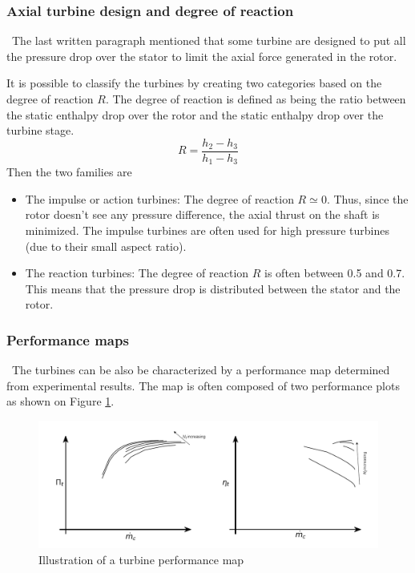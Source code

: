 \subsubsection{Axial turbine design and degree of reaction}
\quad\, The last written paragraph mentioned that some turbine are designed to put all the pressure drop over the stator to limit the axial force generated in the rotor.

It is possible to classify the turbines by creating two categories based on the degree of reaction $R$. The degree of reaction is defined as being the ratio between the static enthalpy drop over the rotor and the static enthalpy drop over the turbine stage.
\begin{equation}
R = \frac{h_2 - h_3}{h_1 - h_3}\label{eq:C3_R}
\end{equation}
Then the two families are 

\begin{itemize}
\item The impulse or action turbines: The degree of reaction $R\simeq 0$. Thus, since the rotor doesn't see any pressure difference, the axial thrust on the shaft is minimized. The impulse turbines are often used for high pressure turbines (due to their small aspect ratio).
\item The reaction turbines: The degree of reaction $R$ is often between 0.5 and 0.7. This means that the pressure drop is distributed between the stator and the rotor. 
\end{itemize}

\subsubsection{Performance maps}
\quad\, The turbines can be also be characterized by a performance map determined from experimental results. The map is often composed of two performance plots as shown on Figure \ref{fig:C3_turbmap}.

\begin{figure}[h]
\centering
\includegraphics[width=\textwidth]{Turb_Map.png}
\caption{Illustration of a turbine performance map}
\label{fig:C3_turbmap}
\end{figure}  


